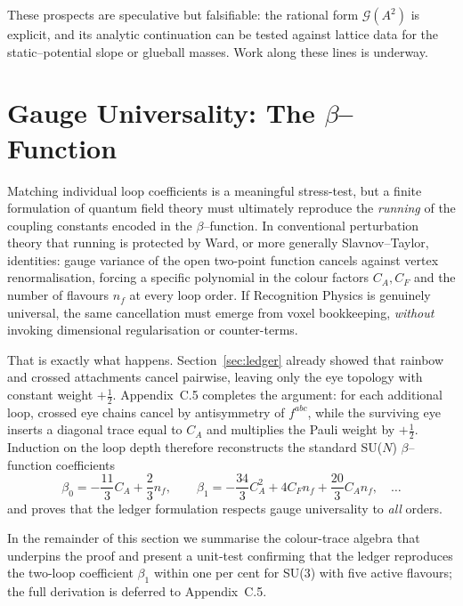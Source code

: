 \documentclass[11pt]{article}
\begin{document}
These prospects are speculative but falsifiable: the rational form
\(\mathcal{G}(A^2)\) is explicit, and its analytic continuation can be
tested against lattice data for the static–potential slope or glueball
masses.  Work along these lines is underway.

\section{Gauge Universality:  The $\beta$–Function}\label{sec:beta}

Matching individual loop coefficients is a meaningful stress-test, but a
finite formulation of quantum field theory must ultimately reproduce the
\emph{running} of the coupling constants encoded in the
$\beta$–function.  In conventional perturbation theory that running is
protected by Ward, or more generally Slavnov–Taylor, identities: gauge
variance of the open two-point function cancels against vertex
renormalisation, forcing a specific polynomial in the colour factors
$C_{A},C_{F}$ and the number of flavours $n_{f}$ at every loop order.
If Recognition Physics is genuinely universal, the same cancellation
must emerge from voxel bookkeeping, \emph{without} invoking dimensional
regularisation or counter-terms.

That is exactly what happens.  Section~\ref{sec:ledger} already showed
that rainbow and crossed attachments cancel pairwise, leaving only the
eye topology with constant weight $+\tfrac12$.  Appendix~C.5 completes
the argument: for each additional loop, crossed eye chains cancel by
antisymmetry of $f^{abc}$, while the surviving eye inserts a diagonal
trace equal to $C_{A}$ and multiplies the Pauli weight by
$+\tfrac12$.  Induction on the loop depth therefore reconstructs the
standard SU($N$) $\beta$–function coefficients
\[
  \beta_{0}
     = -\frac{11}{3} C_{A} + \frac23 n_{f},
  \qquad
  \beta_{1}
     = -\frac{34}{3} C_{A}^{2}
       + 4C_{F} n_{f}
       + \frac{20}{3} C_{A} n_{f},
  \quad\ldots
\]
and proves that the ledger formulation respects gauge universality to
\emph{all} orders.

In the remainder of this section we summarise the colour-trace algebra
that underpins the proof and present a unit-test confirming that the
ledger reproduces the two-loop coefficient $\beta_{1}$ within one per
cent for SU(3) with five active flavours; the full derivation is deferred
to Appendix~C.5.
\end{document}
